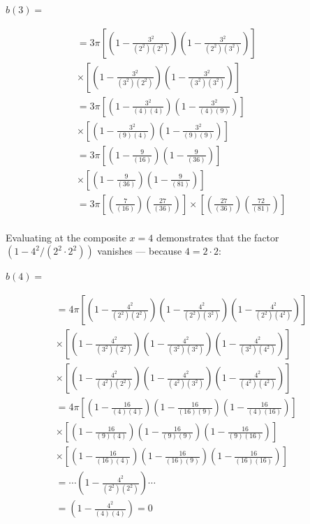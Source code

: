 \documentclass{article}
\begin{document}
$b(3) = $

\begin{align*}
= 3\pi\left[ \left( 1 - \frac{3^2}{(2^2)(2^2)}\right) \left( 1 - \frac{3^2}{(2^2)(3^2)}\right)  \right] \\
\times \left[ \left( 1 - \frac{3^2}{(3^2)(2^2)}\right) \left( 1 - \frac{3^2}{(3^2)(3^2)}\right)  \right] \\
= 3\pi\left[ \left( 1 - \frac{3^2}{(4)(4)}\right) \left( 1 - \frac{3^2}{(4)(9)}\right)  \right] \\
\times \left[ \left( 1 - \frac{3^2}{(9)(4)}\right) \left( 1 - \frac{3^2}{(9)(9)}\right)  \right] \\
= 3\pi\left[ \left( 1 - \frac{9}{(16)}\right) \left( 1 - \frac{9}{(36)}\right)  \right] \\
\times \left[ \left( 1 - \frac{9}{(36)}\right) \left( 1 - \frac{9}{(81)}\right)  \right] \\
= 3\pi\left[ \left(\frac{7}{(16)}\right) \left(\frac{27}{(36)}\right)  \right] \times \left[ \left(\frac{27}{(36)}\right) \left(\frac{72}{(81)}\right)  \right] \\
\end{align*}

Evaluating at the composite $x = 4$ demonstrates that the factor $(1 - 4^2/(2^2 \cdot 2^2))$ vanishes — because $4 = 2 \cdot 2$:

$b(4) = $

\begin{align*}
= 4\pi\left[ \left( 1 - \frac{4^2}{(2^2)(2^2)}\right) \left( 1 - \frac{4^2}{(2^2)(3^2)}\right) \left( 1 - \frac{4^2}{(2^2)(4^2)}\right) \right] \\
\times \left[ \left( 1 - \frac{4^2}{(3^2)(2^2)}\right) \left( 1 - \frac{4^2}{(3^2)(3^2)}\right) \left( 1 - \frac{4^2}{(3^2)(4^2)}\right) \right] \\
\times \left[ \left( 1 - \frac{4^2}{(4^2)(2^2)}\right) \left( 1 - \frac{4^2}{(4^2)(3^2)}\right) \left( 1 - \frac{4^2}{(4^2)(4^2)}\right) \right] \\
= 4\pi\left[ \left( 1 - \frac{16}{(4)(4)}\right) \left( 1 - \frac{16}{(16)(9)}\right) \left( 1 - \frac{16}{(4)(16)}\right) \right] \\
\times \left[ \left( 1 - \frac{16}{(9)(4)}\right) \left( 1 - \frac{16}{(9)(9)}\right) \left( 1 - \frac{16}{(9)(16)}\right) \right] \\
\times \left[ \left( 1 - \frac{16}{(16)(4)}\right) \left( 1 - \frac{16}{(16)(9)}\right) \left( 1 - \frac{16}{(16)(16)}\right) \right] \\
= \cdots \left( 1 - \frac{4^2}{(2^2)(2^2)}\right) \cdots \\
= \left( 1 - \frac{4^2}{(4)(4)}\right) = 0 \\
\end{align*}
\end{document}
